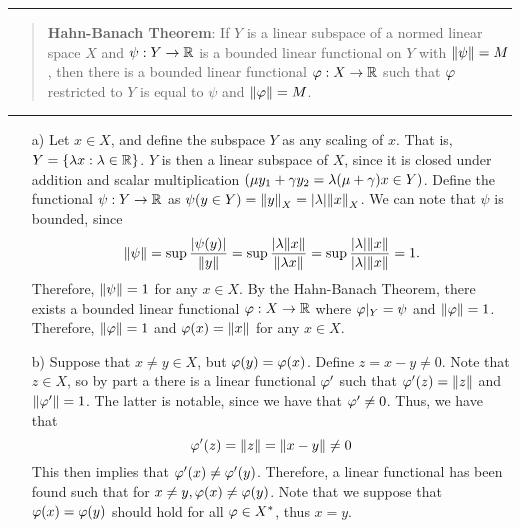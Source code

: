 \begin{solution}
    \begin{center}\rule{16.5cm}{0.5pt}\end{center}
    \begin{quote}
    \vspace{-6mm}
        \textbf{Hahn-Banach Theorem}: If $Y$ is a linear subspace of a normed linear space $X$ and $\psi: Y \rightarrow \mathbb{R}$ is a bounded linear functional on $Y$ with $\norm{\psi} = M$, then there is a bounded linear functional $\varphi : X \rightarrow \mathbb{R}$ such that $\varphi$ restricted to $Y$ is equal to $\psi$ and $\norm{\varphi} = M$.  
    \end{quote}
    \vspace{-12mm}
    \begin{center}\rule{16.5cm}{0.5pt}\end{center}
    \begin{itemize}
    \item [a)] Let $x \in X$, and define the subspace $Y$ as any scaling of $x$. That is, $Y = \{ \mathrm{\lambda} x : \mathrm{\lambda} \in \mathbb{R}\}$. $Y$ is then a linear subspace of $X$, since it is closed under addition and scalar multiplication $(\mu y_1 + \gamma y_2 = \mathrm{\lambda}(\mu + \gamma)x \in Y)$. Define the functional $\psi: Y \rightarrow \mathbb{R}$ as $\psi (y \in Y) = \norm{y}_X = |\mathrm{\lambda}|\norm{x}_X$. We can note that $\psi$ is bounded, since 
    \[\norm{\psi} = \sup \frac{|\psi(y)|}{\norm{y}} = \sup\frac{|\mathrm{\lambda} \norm{x}}{\norm{\mathrm{\lambda} x}} = \sup \frac{|\mathrm{\lambda}|\norm{x}}{|\mathrm{\lambda}| \norm{x}} = 1.\]
    Therefore, $\norm{\psi} = 1$ for any $x \in X$. By the Hahn-Banach Theorem, there exists a bounded linear functional $\varphi: X \rightarrow \mathbb{R}$ where $\varphi|_{Y} = \psi$ and $\norm{\varphi} = 1$. Therefore, $\norm{\varphi} = 1$ and $\varphi(x) = \norm{x}$ for any $x \in X$. 
    \item[b)] Suppose that $x \neq y \in X$, but $\varphi (y) = \varphi(x)$. Define $z = x - y \neq 0$. Note that $z \in X$, so by part a there is a linear functional $\varphi'$ such that $\varphi'(z) = \norm{z}$ and $\norm{\varphi'} = 1$. The latter is notable, since we have that $\varphi' \neq 0$. Thus, we have that 
    \[\varphi'(z) = \norm{z} = \norm{x - y} \neq 0\]
    This then implies that $\varphi'(x) \neq \varphi'(y)$. Therefore, a linear functional has been found such that for $x \neq y, \varphi(x) \neq \varphi(y)$. Note that we suppose that $\varphi(x) = \varphi(y)$ should hold for all $\varphi \in X^{*}$, thus $x = y$.
    \end{itemize}
\end{solution}

\newpage
